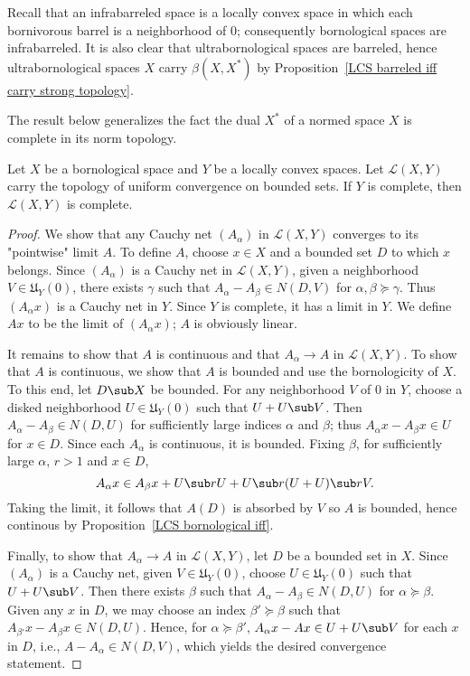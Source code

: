 Recall that an infrabarreled space is a locally convex space in which each bornivorous barrel is a neighborhood of $0$; consequently bornological spaces are infrabarreled. It is also clear that ultrabornological spaces are barreled, hence ultrabornological spaces $X$ carry $\beta(X,X^*)$ by Proposition~\ref{LCS barreled iff carry strong topology}.\par
The result below generalizes the fact the dual $X^*$ of a normed space $X$ is complete in its norm topology.
\begin{proposition}\label{LCS bornological L(X,Y) complete if Y complete}
Let $X$ be a bornological space and $Y$ be a locally convex spaces. Let $\mathcal{L}(X,Y)$ carry the topology of uniform convergence on bounded sets. If $Y$ is complete, then $\mathcal{L}(X,Y)$ is complete.
\end{proposition}
\begin{proof}
We show that any Cauchy net $(A_\alpha)$ in $\mathcal{L}(X,Y)$ converges to its "pointwise" limit $A$. To define $A$, choose $x\in X$ and a bounded set $D$ to which $x$ belongs. Since $(A_\alpha)$ is a Cauchy net in $\mathcal{L}(X,Y)$, given a neighborhood $V\in\mathfrak{U}_Y(0)$, there exists $\gamma$ such that $A_\alpha-A_\beta\in N(D,V)$ for $\alpha,\beta\succeq\gamma$. Thus $(A_\alpha x)$ is a Cauchy net in $Y$. Since $Y$ is complete, it has a limit in $Y$. We define $Ax$ to be the limit of $(A_\alpha x)$; $A$ is obviously linear.\par
It remains to show that $A$ is continuous and that $A_\alpha\to A$ in $\mathcal{L}(X,Y)$. To show that $A$ is continuous, we show that $A$ is bounded and use the bornologicity of $X$. To this end, let $D\sub X$ be bounded. For any neighborhood $V$ of $0$ in $Y$, choose a disked neighborhood $U\in\mathfrak{U}_Y(0)$ such that $U+U\sub V$. Then $A_\alpha-A_\beta\in N(D,U)$ for sufficiently large indices $\alpha$ and $\beta$; thus $A_\alpha x-A_\beta x\in U$ for $x\in D$. Since each $A_\alpha$ is continuous, it is bounded. Fixing $\beta$, for sufficiently large $\alpha$, $r>1$ and $x\in D$,
\[A_\alpha x\in A_\beta x+U\sub rU+U\sub r(U+U)\sub rV.\]
Taking the limit, it follows that $A(D)$ is absorbed by $V$ so $A$ is bounded, hence continous by Proposition~\ref{LCS bornological iff}.\par
Finally, to show that $A_\alpha\to A$ in $\mathcal{L}(X,Y)$, let $D$ be a bounded set in $X$. Since $(A_\alpha)$ is a Cauchy net, given $V\in\mathfrak{U}_Y(0)$, choose $U\in\mathfrak{U}_Y(0)$ such that $U+U\sub V$. Then there exists $\beta$ such that $A_\alpha-A_\beta\in N(D,U)$ for $\alpha\succeq\beta$. Given any $x$ in $D$, we may choose an index $\beta'\succeq\beta$ such that $A_{\beta'}x-A_\beta x\in N(D,U)$. Hence, for $\alpha\succeq\beta'$, $A_\alpha x-Ax\in U+U\sub V$ for each $x$ in $D$, i.e., $A-A_\alpha\in N(D,V)$, which yields the desired convergence statement.
\end{proof}

